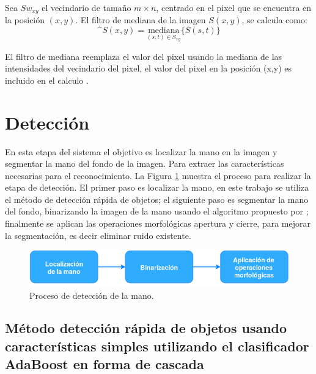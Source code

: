 Sea $Sw_{xy}$ el vecindario de tamaño $m \times n$, centrado en el pixel que se encuentra en la posición $(x,y)$. El filtro de mediana de la imagen $S(x,y)$, se calcula como: 
\begin{equation}
\^S(x,y)=\underset{(s,t)\in S_{xy}}{\text{mediana}} \lbrace S(s,t)\rbrace
\end{equation}

El filtro de mediana reemplaza el valor del pixel usando la mediana de las intensidades del vecindario del pixel, el valor del pixel en la posición (x,y) es incluido en el calculo \citep{Gonzalez2002}. 
 



\section{Detección}\label{sec:Detection}

En esta etapa del sistema el objetivo es localizar la mano en la imagen y segmentar la mano del fondo de la imagen. Para extraer las características necesarias para el reconocimiento.
La Figura \ref{fig:ProcesoDeteccion} muestra el proceso para  realizar la etapa de detección. El primer paso es localizar la mano, en este trabajo se utiliza el método de detección rápida de objetos; el siguiente paso es segmentar la mano del fondo, binarizando la imagen de la mano usando el algoritmo propuesto por \citep{Otsu1979}; finalmente se aplican las operaciones morfológicas apertura y cierre, para mejorar la segmentación, es decir eliminar ruido existente. 

\begin{figure}[h!]
\begin{center}
\includegraphics[scale=.7]{./Figures/Detection.png}
\end{center}
\caption{Proceso de detección de la mano.}
\label{fig:ProcesoDeteccion}
\end{figure} 

\subsection{Método detección rápida de objetos usando características simples utilizando el clasificador AdaBoost en forma de cascada}\label{subsec:ViolaJones}

